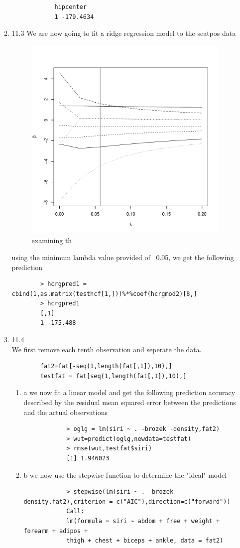 \documentclass[11pt]{article}
\begin{document}
\begin{enumerate}
\begin{enumerate}
\begin{verbatim}
			hipcenter
			1 -179.4634
		\end{verbatim}
	\item 11.3
	We are now going to fit a ridge regression model to the seatpos data
	\begin{figure}[H]
		\centering
		\includegraphics[width=10cm,height=10cm]{hcrgp.pdf}
		\caption[paic]{examining th}
		\label{hcrgp}
	\end{figure}
	using the minimum lambda value provided of ~0.05, we get the following prediction
	\begin{verbatim}
		> hcrgpred1 = cbind(1,as.matrix(testhcf[1,]))%*%coef(hcrgmod2)[8,]
		> hcrgpred1
		[,1]
		1 -175.488
	\end{verbatim}
	\item 11.4\\
	We first remove each tenth observation and seperate the data.
	\begin{verbatim}
		fat2=fat[-seq(1,length(fat[,1]),10),]
		testfat = fat[seq(1,length(fat[,1]),10),]
	\end{verbatim} 
	\begin{enumerate}
		\item a
		we now fit a linear model and get the following prediction accuracy described by the residual mean squared error between the predictions and the actual observations
		\begin{verbatim}
			> oglg = lm(siri ~ . -brozek -density,fat2)
			> wut=predict(oglg,newdata=testfat)
			> rmse(wut,testfat$siri)
			[1] 1.946023
		\end{verbatim}
		\item b
		we now use the stepwise function to determine the "ideal" model 
		\begin{verbatim}
			> stepwise(lm(siri ~ . -brozek -density,fat2),criterion = c("AIC"),direction=c("forward"))
			Call:
			lm(formula = siri ~ abdom + free + weight + forearm + adipos + 
			thigh + chest + biceps + ankle, data = fat2)
			

\end{verbatim}
\end{enumerate}
\end{enumerate}
\end{enumerate}
\end{document}
